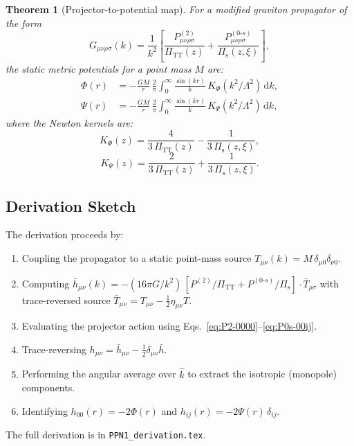 \documentclass[11pt,a4paper]{article}
\theoremstyle{plain}
\newtheorem{theorem}{Theorem}[section]
\theoremstyle{definition}
\theoremstyle{remark}
\newcommand{\dd}{\mathrm{d}}
\begin{document}
\begin{theorem}[Projector-to-potential map]\label{thm:proj-pot}
For a modified graviton propagator of the form
\begin{equation}\label{eq:G-full}
  G_{\mu\nu\rho\sigma}(k)
  = \frac{1}{k^2}\left[
    \frac{P^{(2)}_{\mu\nu\rho\sigma}}{\Pi_{\mathrm{TT}}(z)}
    + \frac{P^{(0\text{-}s)}_{\mu\nu\rho\sigma}}{\Pi_{\mathrm{s}}(z,\xi)}
  \right],
\end{equation}
the static metric potentials for a point mass $M$ are:
\begin{align}
  \Phi(r) &= -\frac{GM}{r}\,\frac{2}{\pi}
  \int_0^\infty \frac{\sin(kr)}{k}\, K_\Phi(k^2/\Lambda^2)\,\dd k,
  \label{eq:Phi-exact}\\
  \Psi(r) &= -\frac{GM}{r}\,\frac{2}{\pi}
  \int_0^\infty \frac{\sin(kr)}{k}\, K_\Psi(k^2/\Lambda^2)\,\dd k,
  \label{eq:Psi-exact}
\end{align}
where the \emph{Newton kernels} are:
\begin{equation}\label{eq:K-Phi}
  \boxed{K_\Phi(z)
  = \frac{4}{3\,\Pi_{\mathrm{TT}}(z)}
  - \frac{1}{3\,\Pi_{\mathrm{s}}(z,\xi)},}
\end{equation}
\begin{equation}\label{eq:K-Psi}
  \boxed{K_\Psi(z)
  = \frac{2}{3\,\Pi_{\mathrm{TT}}(z)}
  + \frac{1}{3\,\Pi_{\mathrm{s}}(z,\xi)}.}
\end{equation}
\end{theorem}

\subsection{Derivation Sketch}

The derivation proceeds by:
\begin{enumerate}[nosep]
  \item Coupling the propagator to a static point-mass source
    $T_{\mu\nu}(k) = M\,\delta_{\mu 0}\delta_{\nu 0}$.
  \item Computing $\bar{h}_{\mu\nu}(k) = -(16\pi G/k^2)\,
    [P^{(2)}/\Pi_{\mathrm{TT}} + P^{(0\text{-}s)}/\Pi_{\mathrm{s}}]
    \cdot \bar{T}_{\rho\sigma}$ with trace-reversed source
    $\bar{T}_{\mu\nu} = T_{\mu\nu} - \frac{1}{2}\eta_{\mu\nu}T$.
  \item Evaluating the projector action using
    Eqs.~\eqref{eq:P2-0000}--\eqref{eq:P0s-00ij}.
  \item Trace-reversing $h_{\mu\nu} = \bar{h}_{\mu\nu}
    - \frac{1}{2}\delta_{\mu\nu}\bar{h}$.
  \item Performing the angular average over $\hat{k}$ to extract
    the isotropic (monopole) components.
  \item Identifying $h_{00}(r) = -2\Phi(r)$ and
    $h_{ij}(r) = -2\Psi(r)\,\delta_{ij}$.
\end{enumerate}
The full derivation is in \texttt{PPN1\_derivation.tex}.
\end{document}
